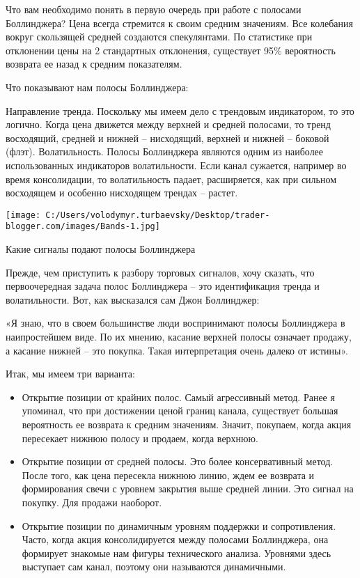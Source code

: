 \documentclass[a5paper]{article}
\begin{document}
Что вам необходимо понять в первую очередь при работе с полосами Боллинджера? Цена всегда стремится к своим средним значениям. Все колебания вокруг скользящей средней создаются спекулянтами. По статистике при отклонении цены на 2 стандартных отклонения, существует 95\% вероятность возврата ее назад к средним показателям.

Что показывают нам полосы Боллинджера:

    Направление тренда. Поскольку мы имеем дело с трендовым индикатором, то это логично. Когда цена движется между верхней и средней полосами, то тренд восходящий, средней и нижней – нисходящий, верхней и нижней – боковой (флэт).
    Волатильность. Полосы Боллинджера являются одним из наиболее
    использованных индикаторов волатильности. Если канал сужается,
    например во время консолидации, то волатильность падает,
    расширяется, как при сильном восходящем и особенно нисходящем
    трендах – растет.

\texttt{[image: C:/Users/volodymyr.turbaevsky/Desktop/trader-blogger.com/images/Bands-1.jpg]}

Какие сигналы подают полосы Боллинджера

Прежде, чем приступить к разбору торговых сигналов, хочу сказать, что первоочередная задача полос Боллинджера – это идентификация тренда и волатильности. Вот, как высказался сам Джон Боллинджер:

«Я знаю, что в своем большинстве люди воспринимают полосы Боллинджера в наипростейшем виде. По их мнению, касание верхней полосы означает продажу, а касание нижней – это покупка. Такая интерпретация  очень далеко от истины».

Итак, мы имеем три варианта:
\begin{itemize}
\item     Открытие позиции от крайних полос. Самый агрессивный метод. Ранее я упоминал, что при достижении ценой границ канала, существует большая вероятность ее возврата к средним значениям. Значит, покупаем, когда акция пересекает нижнюю полосу и продаем, когда верхнюю.
\item     Открытие позиции от средней полосы. Это более консервативный метод. После того, как цена пересекла нижнюю линию, ждем ее возврата и формирования свечи с уровнем закрытия выше средней линии. Это сигнал на покупку. Для продажи наоборот.
\item     Открытие позиции по динамичным уровням поддержки и
    сопротивления. Часто, когда акция консолидируется между полосами
    Боллинджера, она формирует знакомые нам фигуры технического
    анализа. Уровнями здесь выступает сам канал, поэтому они
    называются динамичными.
  \end{itemize}
\end{document}
